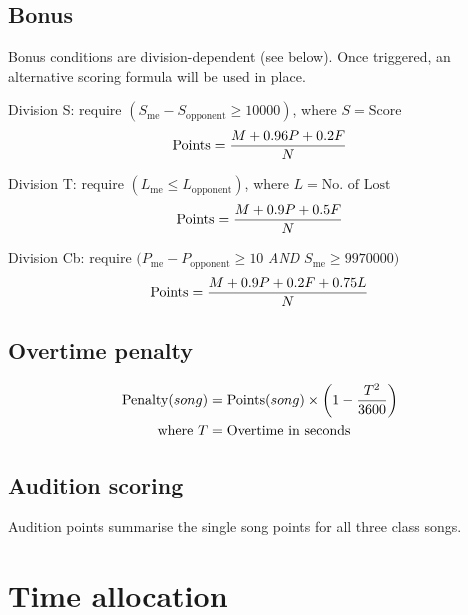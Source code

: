 \documentclass{article}
\newcommand{\alert}[1]{{\color{red} #1}}
\newcommand{\penalyformula}[1]{{\color{cyan} #1}}
\begin{document}
\subsection{Bonus}

Bonus conditions are division-dependent (see below).
Once triggered, an alternative scoring formula
will be used in place.  %

Division S: require $(S_\text{me} - S_\text{opponent} \geq \num[group-separator={,}]{10000})$, where $S = \text{Score}$
\alert{
	\begin{equation*}
		\text{Points} = \frac{M + 0.96P + 0.2F}N
	\end{equation*}
}

Division T: require $(L_\text{me} \leq L_\text{opponent})$, where $L = \text{No.~of Lost}$
\alert{
	\begin{equation*}
		\text{Points} = \frac{M + 0.9P + 0.5F}N
	\end{equation*}
}

Division Cb: require $(P_\text{me} - P_\text{opponent} \geq 10$ \emph{AND} $S_\text{me} \geq \num[group-separator={,}]{9970000})$
\alert{
	\begin{equation*}
		\text{Points}		= \frac{M + 0.9P + 0.2F + 0.75L} N
	\end{equation*}
}

\subsection{Overtime penalty}
\penalyformula{
	\begin{align*}
		\text{Penalty}(song) & = \text{Points}(song) \times \left(1-\frac{{T}^2} {3600}\right) \\
		\text{where}~T       & =\text{Overtime in seconds}
	\end{align*}
}

\subsection{Audition scoring}

Audition points summarise the single song points
for all three class songs.

\section{Time allocation}
\end{document}
